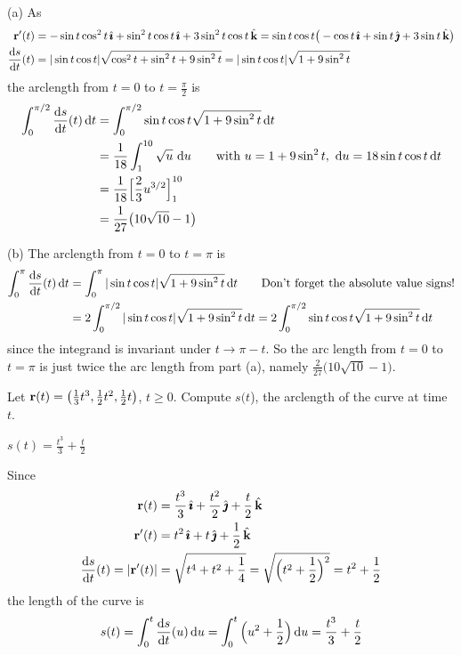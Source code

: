 \begin{solution} (a)
	As
	\begin{align*}
	\vr'(t) & = -\sin t\cos^2 t\,\hi + \sin^2 t\cos t\,\hi + 3\sin^2 t\cos t\,\hk
	= \sin t\cos t\big(-\cos t\,\hi +\sin t\,\hj +3\sin t\,\hk\big) \\
	\diff{s}{t}(t) & = |\sin t\cos t|\sqrt{\cos^2 t + \sin ^2 t + 9\sin^2 t}
	= |\sin t\cos t|\sqrt{1+ 9\sin^2 t}
	\end{align*}
	the arclength from $t = 0$ to $t = \frac{\pi}{2}$ is
	\begin{align*}
	\int_0^{\pi/2} \diff{s}{t}(t)\,\dee{t}
	&=\int_0^{\pi/2} \sin t\cos t \sqrt{1+ 9\sin^2 t}\,\dee{t} \\
	&=\frac{1}{18}\int_1^{10} \sqrt{u}\ \dee{u} \qquad
	\text{with } u = 1+ 9\sin^2 t,\ \dee{u}  = 18\sin t\cos t\,\dee{t}\\
	&=\frac{1}{18}\Big[\frac{2}{3}u^{3/2}\Big]_1^{10}\\
	&=\frac{1}{27}\big(10\sqrt{10}-1\big)
	\end{align*}
	
	(b) The arclength from $t = 0$ to $t = \pi$ is
	\begin{align*}
	\int_0^{\pi} \diff{s}{t}(t)\,\dee{t}
	&=\int_0^{\pi} |\sin t\cos t| \sqrt{1+ 9\sin^2 t}\,\dee{t} 
	\qquad\text{Don't forget the absolute value signs!}\\
	&=2\int_0^{\pi/2} |\sin t\cos t| \sqrt{1+ 9\sin^2 t}\,\dee{t} 
	= 2\int_0^{\pi/2} \sin t\cos t \sqrt{1+ 9\sin^2 t}\,\dee{t} 
	\end{align*}
	since the integrand is invariant under $t\rightarrow\pi-t$. So the arc length
	from $t = 0$ to $t = \pi$ is just twice the arc length from part (a), namely $\frac{2}{27}\big(10\sqrt{10}-1\big)$.
	
\end{solution}
\begin{question}[M317 2017D] %
Let $\mathbf{r}(t)=\big(\frac{1}{3}t^3,\frac{1}{2}t^2,\frac{1}{2}t\big)$,
$t\ge 0$. Compute $s(t$), the arclength of the curve at time
$t$.
\end{question}


\begin{answer} 
$s(t)=\frac{t^3}{3} +\frac{t}{2}$
\end{answer}

\begin{solution} 
Since
\begin{align*}
\vr(t)&= \frac{t^3}{3}\,\hi + \frac{t^2}{2}\,\hj +  \frac{t}{2}\,\hk\\
\vr'(t)&= t^2\,\hi + t\,\hj + \frac{1}{2}\,\hk \\
\diff{s}{t}(t)=|\vr'(t)|&=\sqrt{t^4+t^2+\frac{1}{4}}
=\sqrt{\Big(t^2+\frac{1}{2}\Big)^2}=t^2+\frac{1}{2}
\end{align*}
the length of the curve is
\begin{align*}
s(t)=\int_0^t \diff{s}{t}(u)\,\dee{u}
=\int_0^t \Big(u^2+\frac{1}{2}\Big)\,\dee{u}
=\frac{t^3}{3} +\frac{t}{2}
\end{align*}
\end{solution}


